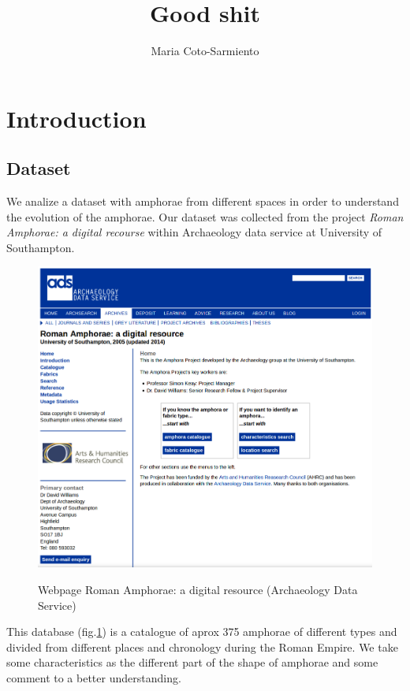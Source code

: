 \documentclass[10pt,a4paper]{article}
\author{Maria Coto-Sarmiento}
\title{Good shit}
\begin{document}
\maketitle

\section{Introduction}


\subsection{Dataset}

We analize a dataset with amphorae from different spaces in order to understand the evolution of the amphorae. Our dataset was collected from the project \emph{Roman Amphorae: a digital recourse} within Archaeology data service at University of Southampton. \\

\begin{figure}[hbp]
	\centering
\includegraphics[scale=0.30]{picture1.png}
\label{picwebarch}
\caption{Webpage Roman Amphorae: a digital resource (Archaeology Data Service)}
\end{figure} 


This database (fig.\ref{picwebarch}) is a catalogue of aprox 375 amphorae of different types and divided from different places and chronology during the Roman Empire. We take some characteristics as the different part of the shape of amphorae and some comment to a better understanding. 
\end{document}
